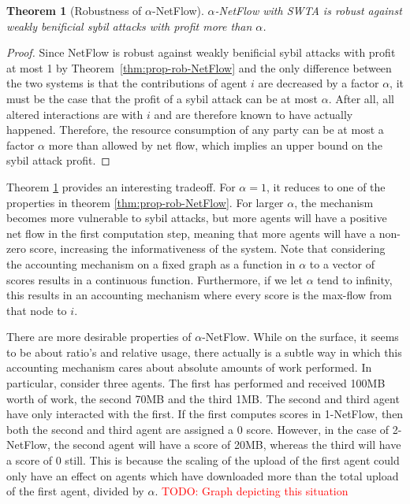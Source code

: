 \documentclass[a4paper,11pt]{book}
\newcommand\musthave[1]{\textcolor{red}{TODO: #1}}
\newtheorem{theorem}{Theorem}
\theoremstyle{definition}
\begin{document}
\begin{theorem}[Robustness of $\alpha$-NetFlow]
    $\alpha$-NetFlow with SWTA is robust against weakly benificial sybil attacks with
    profit more than $\alpha$.
    \label{thm:sybil-anf}
\end{theorem}

\begin{proof}
    Since NetFlow is robust against weakly benificial sybil attacks with profit at most
    1 by Theorem~\ref{thm:prop-rob-NetFlow}  and the only difference between the two systems is that the contributions of
    agent $i$ are decreased by a factor $\alpha$, it must be the case that the profit
    of a sybil attack can be at most $\alpha$. After all, all altered interactions
    are with $i$ and are therefore known to have actually happened. Therefore, the
    resource consumption of any party can be at most a factor $\alpha$ more than allowed
    by net flow, which implies an upper bound on the sybil attack profit.
\end{proof}

Theorem \ref{thm:sybil-anf} provides an interesting tradeoff. For $\alpha=1$, it reduces
to one of the properties in theorem \ref{thm:prop-rob-NetFlow}. For larger $\alpha$,
the mechanism becomes more vulnerable to sybil attacks, but more agents will have
a positive net flow in the first computation step, meaning that more agents will
have a non-zero score, increasing the informativeness of the system. Note
that considering the accounting mechanism on a fixed graph as a function in $\alpha$ to
a vector of scores results in a continuous function. Furthermore, if we let $\alpha$
tend to infinity, this results in an accounting mechanism where every score is the
max-flow from that node to $i$. 


There are more desirable properties of $\alpha$-NetFlow. While on the surface, it seems to
be about ratio's and relative usage, there actually is a subtle way in which
this accounting mechanism cares about absolute amounts of work performed. 
In particular, consider three agents. The first has performed and received
100MB worth of work, the second 70MB and the third 1MB. The second and third
agent have only interacted with the first. If the first computes scores
in 1-NetFlow, then both the second and third agent are assigned a 0 score.
However, in the case of 2-NetFlow, the second agent will have a score of 20MB,
whereas the third will have a score of 0 still. This is because the scaling
of the upload of the first agent could only have an effect on agents which
have downloaded more than the total upload of the first agent, divided
by $\alpha$. 
\musthave{Graph depicting this situation}
\end{document}
